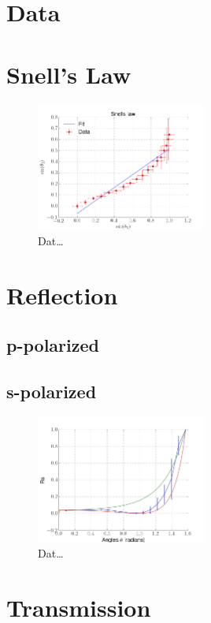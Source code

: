 \section{Data}
\section{Snell's Law}

\begin{figure}[h]
    \centering
    \includegraphics[width=0.5\textwidth]{snell}
    \caption{Dat\ldots}
    \label{fig:fit}
\end{figure}

\section{Reflection}
\subsection{p-polarized}
\subsection{s-polarized}
\begin{figure}[h]
    \centering
    \includegraphics[width=0.5\textwidth]{reflection}
    \caption{Dat\ldots}
    \label{fig:reflection}
\end{figure}



\section{Transmission}
